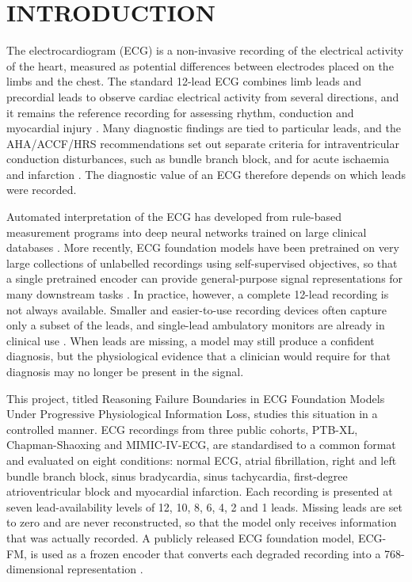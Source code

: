 \chapter{INTRODUCTION}

The electrocardiogram (ECG) is a non-invasive recording of the electrical activity of the heart, measured as potential differences between electrodes placed on the limbs and the chest. The standard 12-lead ECG combines limb leads and precordial leads to observe cardiac electrical activity from several directions, and it remains the reference recording for assessing rhythm, conduction and myocardial injury \cite{KLIGFIELD2007AHA}. Many diagnostic findings are tied to particular leads, and the AHA/ACCF/HRS recommendations set out separate criteria for intraventricular conduction disturbances, such as bundle branch block, and for acute ischaemia and infarction \cite{SURAWICZ2009AHA,WAGNER2009AHA}. The diagnostic value of an ECG therefore depends on which leads were recorded.

Automated interpretation of the ECG has developed from rule-based measurement programs \cite{SCHLAPFER2017COMPUTER} into deep neural networks trained on large clinical databases \cite{HANNUN2019CARDIOLOGIST,STRODTHOFF2021PTBXL}. More recently, ECG foundation models have been pretrained on very large collections of unlabelled recordings using self-supervised objectives, so that a single pretrained encoder can provide general-purpose signal representations for many downstream tasks \cite{MCKEEN2025ECGFM}. In practice, however, a complete 12-lead recording is not always available. Smaller and easier-to-use recording devices often capture only a subset of the leads, and single-lead ambulatory monitors are already in clinical use \cite{HANNUN2019CARDIOLOGIST,REYNA2022ISSUES}. When leads are missing, a model may still produce a confident diagnosis, but the physiological evidence that a clinician would require for that diagnosis may no longer be present in the signal.

This project, titled Reasoning Failure Boundaries in ECG Foundation Models Under Progressive Physiological Information Loss, studies this situation in a controlled manner. ECG recordings from three public cohorts, PTB-XL, Chapman-Shaoxing and MIMIC-IV-ECG, are standardised to a common format and evaluated on eight conditions: normal ECG, atrial fibrillation, right and left bundle branch block, sinus bradycardia, sinus tachycardia, first-degree atrioventricular block and myocardial infarction. Each recording is presented at seven lead-availability levels of 12, 10, 8, 6, 4, 2 and 1 leads. Missing leads are set to zero and are never reconstructed, so that the model only receives information that was actually recorded. A publicly released ECG foundation model, ECG-FM, is used as a frozen encoder that converts each degraded recording into a 768-dimensional representation \cite{MCKEEN2025ECGFM}.

